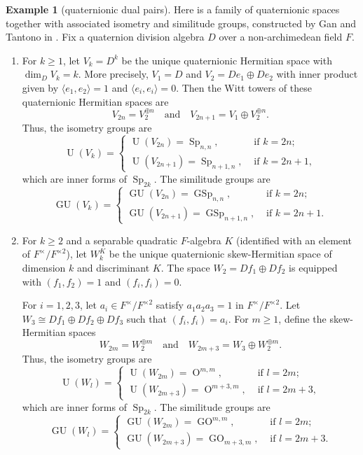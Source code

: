 \documentclass[11pt]{article}
\theoremstyle{plain}
\theoremstyle{remark}
\theoremstyle{definition}
\newtheorem{example}[theorem]{Example}
\DeclareMathOperator{\U}{U}
\DeclareMathOperator{\GU}{GU}
\DeclareMathOperator{\Ot}{O}
\DeclareMathOperator{\GO}{GO}
\DeclareMathOperator{\GSp}{GSp}
\DeclareMathOperator{\Sp}{Sp}
\begin{document}
\begin{example}[quaternionic dual pairs]\label{eGTquasim}
Here is a family of quaternionic spaces together with associated isometry and similitude groups, constructed by Gan and Tantono in \cite[Section~2]{GanTan2014}.
Fix a quaternion division algebra $D$ over a non-archimedean field $F$.
\begin{enumerate}
\item For $k\geq 1$, let $V_k=D^k$ be the unique quaternionic Hermitian space with $\dim_{D}V_{k}=k$.
More precisely, $V_1=D$ and $V_2=D e_{1}\oplus D e_{2}$ with inner product given by $\langle e_1,e_2\rangle=1$ and $\langle e_i,e_i\rangle=0$.
Then the Witt towers of these quaternionic Hermitian spaces are
\[
V_{2n}=V_{2}^{\oplus n}\quad \text{and}\quad V_{2n+1}=V_{1}\oplus V_{2}^{\oplus n}.
\]
Thus, the isometry groups are
\[
\U(V_k)=\begin{cases}
\U(V_{2n})=\Sp_{n,n}, &\text{ if } k=2n;\\
\U(V_{2n+1})=\Sp_{n+1,n}, &\text{ if } k=2n+1,
\end{cases}
\]
which are inner forms of $\Sp_{2k}$.
The similitude groups are
\[
\GU(V_k)=\begin{cases}
\GU(V_{2n})=\GSp_{n,n}, &\text{ if } k=2n;\\
\GU(V_{2n+1})=\GSp_{n+1,n}, &\text{ if } k=2n+1.
\end{cases}
\]

\item For $k\geq 2$ and a separable quadratic $F$-algebra $K$ (identified with an element of $F^{\times}/F^{\times2}$), let $W_k^K$ be the unique quaternionic skew-Hermitian space of dimension $k$ and discriminant $K$.
The space $W_2=D f_1\oplus D f_2$ is equipped with $(f_1,f_2)=1$ and $(f_i,f_i)=0$.

For $i=1,2,3$, let $a_i\in F^{\times}/F^{\times2}$ satisfy $a_1 a_2 a_3=1$ in $F^{\times}/F^{\times2}$.
Let $W_3\cong D f_1\oplus D f_2\oplus D f_3$ such that $(f_i,f_i)=a_i$.
For $m\geq 1$, define the skew-Hermitian spaces
\[
W_{2m}=W_2^{\oplus m}\quad \text{and}\quad W_{2m+3}=W_3\oplus W_2^{\oplus m}.
\]
Thus, the isometry groups are
\[
\U(W_l)=\begin{cases}
\U(W_{2m})=\Ot^{m,m}, &\text{ if } l=2m;\\
\U(W_{2m+3})=\Ot^{m+3,m}, &\text{ if } l=2m+3,
\end{cases}
\]
which are inner forms of $\Sp_{2k}$.
The similitude groups are
\[
\GU(W_l)=\begin{cases}
\GU(W_{2m})=\GO^{m,m}, &\text{ if } l=2m;\\
\GU(W_{2m+3})=\GO_{m+3,m}, &\text{ if } l=2m+3.
\end{cases}
\]
\end{enumerate}


\end{example}
\end{document}
